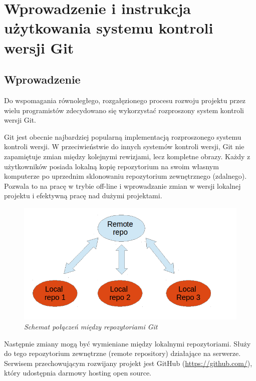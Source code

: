 \chapter{Wprowadzenie i instrukcja użytkowania systemu kontroli wersji Git}
\label{ap:2}

\section{Wprowadzenie}

Do wspomagania równoległego, rozgałęzionego procesu rozwoju projektu przez wielu programistów zdecydowano się wykorzystać rozproszony system kontroli wersji Git. 

	Git jest obecnie najbardziej popularną implementacją rozproszonego systemu kontroli wersji. W przeciwieństwie do innych systemów kontroli wersji, Git nie zapamiętuje zmian między kolejnymi rewizjami, lecz kompletne obrazy. Każdy z użytkowników posiada lokalną kopię repozytorium na swoim własnym komputerze po uprzednim sklonowaniu repozytorium zewnętrznego (zdalnego).  Pozwala to na pracę w trybie off-line i wprowadzanie zmian w wersji lokalnej projektu i efektywną pracę nad dużymi projektami.
	
\begin{figure}[!h]
    \begin{center}
    \includegraphics[angle=0,scale=0.5]{img/repo.png}
    \end{center}
    \caption{\em Schemat połączeń między repozytoriami Git}
    \label{fig:client}
\end{figure}

Następnie zmiany mogą być wymieniane między lokalnymi repozytoriami. Służy do tego repozytorium zewnętrzne (remote repository) działające na serwerze. Serwisem przechowującym rozwijany projekt jest GitHub (\url{https://github.com/}), który udostępnia darmowy hosting open source. 


